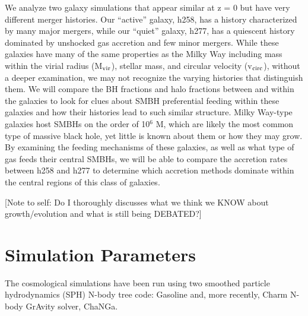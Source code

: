 \documentclass[manuscript]{aastex}
\begin{document}
We analyze two galaxy simulations that appear similar at z = 0 but have very different merger histories. Our ``active'' galaxy, h258, has a history characterized by many major mergers, while our ``quiet'' galaxy, h277, has a quiescent history dominated by unshocked gas accretion and few minor mergers. While these galaxies have many of the same properties as the Milky Way including mass within the virial radius (M$_{\rm vir}$), stellar mass, and circular velocity (v$_{\rm circ}$), without a deeper examination, we may not recognize the varying histories that distinguish them. We will compare the BH fractions and halo fractions between and within the galaxies to look for clues about SMBH preferential feeding within these galaxies and how their histories lead to such similar structure. %
Milky Way-type galaxies host SMBHs on the order of 10$^6$ M, which are likely the most common type of massive black hole, yet little is known about them or how they may grow. By examining the feeding mechanisms of these galaxies, as well as what type of gas feeds their central SMBHs, we will be able to compare the accretion rates between h258 and h277 to determine which accretion methods dominate within the central regions of this class of galaxies.

[Note to self: Do I thoroughly discusses what we think we KNOW about growth/evolution and what is still being DEBATED?]	
  
\section{Simulation Parameters}\label{sec-model}

The cosmological simulations have been run using two smoothed particle hydrodynamics (SPH) N-body tree code: Gasoline \citep[][Stadel 2001, how do I cite a PhD thesis?]{Wadsley2004} and, more recently, Charm N-body GrAvity solver, ChaNGa. 
\end{document}
